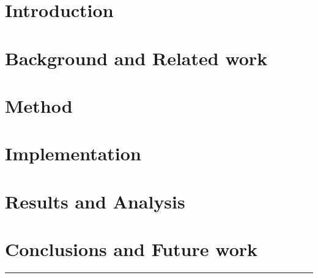 \documentclass[nomenclature, english, bibtex]{kththesis}
\newcommand*{\engExpl}[1]{\todo[inline, backgroundcolor=kth-lightgreen40]{#1}} %
\begin{document}
\chapter{Introduction}
    \label{ch:introduction}
    

\cleardoublepage

\chapter{Background and Related work}
    \label{ch:background}
    

\cleardoublepage

\chapter{Method}
    \label{ch:method}
    

\cleardoublepage

\chapter{Implementation}
    \label{ch:implementation}
    

\cleardoublepage

\chapter{Results and Analysis}
    \label{ch:results_and_analysis}
    

\cleardoublepage

\chapter{Conclusions and Future work}
    \label{ch:conclusions_and_future_work}
    

\noindent\rule{\textwidth}{0.4mm}
\end{document}
